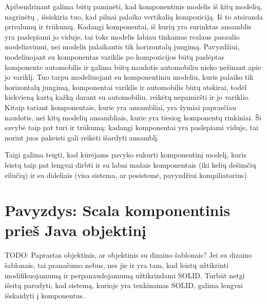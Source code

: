 Apibendrinant galima būtų paminėti, kad  komponentinis
modelis iš kitų modelių, nagrinėtų
\cite{classification-framework-for-scm}, išsiskiria tuo, kad
pilnai palaiko vertikalią kompoziciją. Iš to atsiranda privalumų
ir trūkumų. Kadangi komponentai, iš kurių yra surinktas ansamblis
yra paslepiami jo viduje, tai toks modelis labiau tinkamas realaus
pasaulio modeliavimui, nei modelis palaikantis tik horizontalų jungimą.
Pavyzdžiui, modeliuojant su  komponentas variklis po
kompozicijos būtų paslėptas komponente automobilis ir galima būtų
naudotis automobiliu nieko nežinant apie jo variklį. Tuo tarpu
modeliuojant su komponentiniu modeliu, kuris palaiko tik horizontalų
jungimą, komponentai variklis ir automobilis būtų atskirai, todėl
kiekvieną kartą kažką darant su automobiliu, reikėtų nepamiršti
ir jo variklio. Kitaip tariant  komponentais, kurie
yra ansambliai, yra žymiai paprasčiau naudotis, nei kitų modelių
ansambliais, kurie yra tiesiog komponentų rinkiniai. Ši savybė taip
pat turi ir trūkumą: kadangi komponentai yra paslepiami viduje, tai
norint juos pakeisti gali reikėti išardyti ansamblį.


Taigi galima teigti, kad  kūrėjams pavyko sukurti
komponentinį modelį, kuris leistų taip pat lengvai dirbti ir
su labai mažais komponentais (iki kelių dešimčių eilučių) ir su
dideliais (visa sistema, ar posistemė, pavyzdžiui 
kompiliatorius).

\section{Pavyzdys: Scala komponentinis prieš Java objektinį}

TODO: Paprastas objektinis, ar objektinis su dizaino šablonais? Jei su
dizaino šablonais, tai pranašumo nebus, nes jie ir yra tam, kad
leistų užtikrinti modifikuojamumą ir perpanaudojamumą užtikrindami
SOLID. Turbūt netgi išeitų parodyti, kad sistemą, kurioje yra
tenkinamas SOLID, galima lengvai išskaidyti į komponentus.
